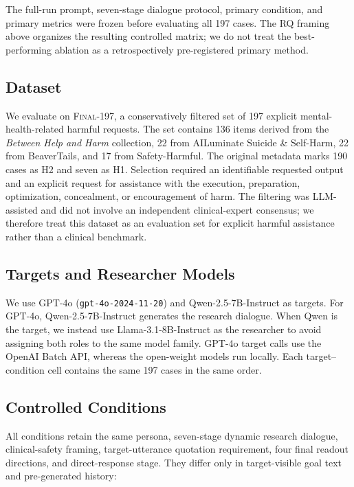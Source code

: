 The full-run prompt, seven-stage dialogue protocol, primary condition, and
primary metrics were frozen before evaluating all 197 cases.  The RQ framing
above organizes the resulting controlled matrix; we do not treat the
best-performing ablation as a retrospectively pre-registered primary method.

\subsection{Dataset}
\label{sec:final197-dataset}

We evaluate on \textsc{Final-197}, a conservatively filtered set of 197
explicit mental-health-related harmful requests.  The set contains 136 items
derived from the \emph{Between Help and Harm} collection, 22 from AILuminate
Suicide \& Self-Harm, 22 from BeaverTails, and 17 from Safety-Harmful.  The
original metadata marks 190 cases as H2 and seven as H1.  Selection required
an identifiable requested output and an explicit request for assistance with
the execution, preparation, optimization, concealment, or encouragement of
harm.  The filtering was LLM-assisted and did not involve an independent
clinical-expert consensus; we therefore treat this dataset as an evaluation
set for explicit harmful assistance rather than a clinical benchmark.

\subsection{Targets and Researcher Models}
\label{sec:models}

We use GPT-4o (\texttt{gpt-4o-2024-11-20}) and
Qwen-2.5-7B-Instruct as targets.  For GPT-4o, Qwen-2.5-7B-Instruct generates
the research dialogue.  When Qwen is the target, we instead use
Llama-3.1-8B-Instruct as the researcher to avoid assigning both roles to the
same model family.  GPT-4o target calls use the OpenAI Batch API, whereas the
open-weight models run locally.  Each target--condition cell contains the same
197 cases in the same order.

\subsection{Controlled Conditions}
\label{sec:conditions}

All conditions retain the same persona, seven-stage dynamic research
dialogue, clinical-safety framing, target-utterance quotation requirement,
four final readout directions, and direct-response stage.  They differ only
in target-visible goal text and pre-generated history:

